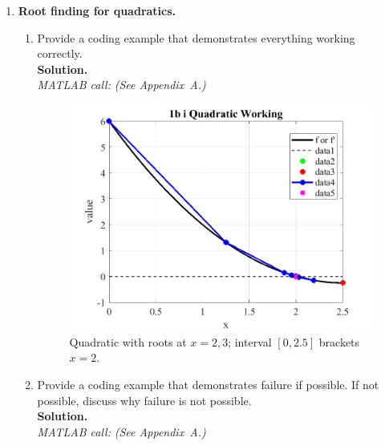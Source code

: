 \documentclass[11pt]{article}
\begin{document}
\begin{enumerate}[label=1(\alph*)]
\begin{enumerate}[label=\roman*)]
		\end{enumerate}
		
		\item \textbf{Root finding for quadratics.}
		\begin{enumerate}[label=\roman*)]
			
			\item Provide a coding example that demonstrates everything working correctly.\\
			\textbf{Solution.}\\
			\textit{MATLAB call:} \emph{(See Appendix~A.)}
			
			\begin{figure}[H]\centering
				\includegraphics[width=0.78\linewidth]{plots/1b_i_Quadratic_Working.png}
				\caption{Quadratic with roots at \(x=2,3\); interval \([0,2.5]\) brackets \(x=2\).}
			\end{figure}
			
			\item Provide a coding example that demonstrates failure if possible. If not possible, discuss why failure is not possible.\\
			\textbf{Solution.}\\
			\textit{MATLAB call:} \emph{(See Appendix~A.)}
			

\end{enumerate}
\end{enumerate}
\end{document}
